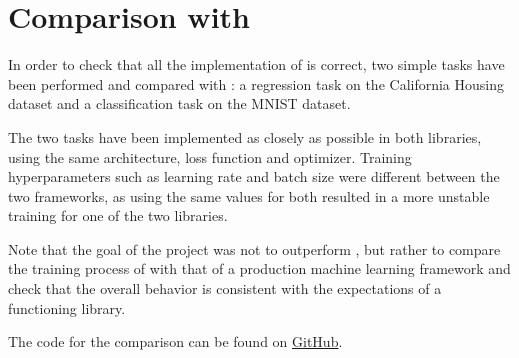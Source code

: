 \part{Comparison with \pytorch}

In order to check that all the implementation of \mfnet is correct, two simple tasks have been performed and compared with \pytorch: a regression task on the California Housing dataset and a classification task on the MNIST dataset.

The two tasks have been implemented as closely as possible in both libraries, using the same architecture, loss function and optimizer. Training hyperparameters such as learning rate and batch size were different between the two frameworks, as using the same values for both resulted in a more unstable training for one of the two libraries.

Note that the goal of the project was not to outperform \pytorch, but rather to compare the training process of \mfnet with that of a production machine learning framework and check that the overall behavior is consistent with the expectations of a functioning library.

The code for the comparison can be found on \href{https://github.com/marchfra/interface}{GitHub}.



